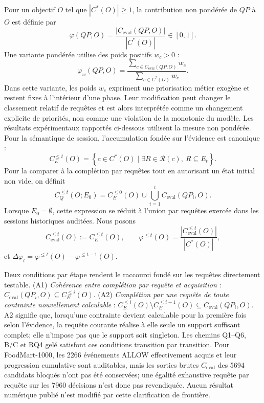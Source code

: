 \documentclass[journal]{IEEEtran}
\begin{document}
Pour un objectif $O$ tel que $|C^*(O)|\ge 1$, la contribution non pondérée de $QP$ à $O$ est définie par
\[
\varphi(QP,O)=\frac{|C_{\mathrm{eval}}(QP,O)|}{|C^*(O)|}\in[0,1].
\]
Une variante pondérée utilise des poids positifs $w_c>0$ :
\[
\varphi_w(QP,O)=\frac{\sum_{c\in C_{\mathrm{eval}}(QP,O)} w_c}{\sum_{c\in C^*(O)} w_c}.
\]
Dans cette variante, les poids $w_c$ expriment une priorisation métier exogène et restent fixes à l'intérieur d'une phase. Leur modification peut changer le classement relatif de requêtes et est alors interprétée comme un changement explicite de priorités, non comme une violation de la monotonie du modèle. Les résultats expérimentaux rapportés ci-dessous utilisent la mesure non pondérée.
Pour la sémantique de session, l'accumulation fondée sur l'évidence est canonique :
\[
C_E^{\le t}(O)=\left\{c\in C^*(O)\mid \exists R\in\mathcal R(c),\ R\subseteq E_t\right\}.
\]
Pour la comparer à la complétion par requêtes tout en autorisant un état initial non vide, on définit
\[
C_Q^{\le t}(O;E_0)=C_E^{\le0}(O)\cup\bigcup_{i=1}^{t} C_{\mathrm{eval}}(QP_i,O).
\]
Lorsque $E_0=\emptyset$, cette expression se réduit à l'union par requêtes exercée dans les sessions historiques auditées. Nous posons
\[
C_{\mathrm{eval}}^{\le t}(O):=C_E^{\le t}(O),\qquad
\varphi^{\le t}(O)=\frac{|C_{\mathrm{eval}}^{\le t}(O)|}{|C^*(O)|},
\]
et $\Delta\varphi_t=\varphi^{\le t}(O)-\varphi^{\le t-1}(O)$.

Deux conditions par étape rendent le raccourci fondé sur les requêtes directement testable. (A1) \emph{Cohérence entre complétion par requête et acquisition} : $C_{\mathrm{eval}}(QP_i,O)\subseteq C_E^{\le i}(O)$. (A2) \emph{Complétion par une requête de toute contrainte nouvellement calculable} : $C_E^{\le i}(O)\setminus C_E^{\le i-1}(O)\subseteq C_{\mathrm{eval}}(QP_i,O)$. A2 signifie que, lorsqu'une contrainte devient calculable pour la première fois selon l'évidence, la requête courante réalise à elle seule un support suffisant complet; elle n'impose pas que le support soit singleton. Les chemins Q1--Q6, B/C et RQ4 gelé satisfont ces conditions transition par transition. Pour FoodMart-1000, les 2266 événements ALLOW effectivement acquis et leur progression cumulative sont auditables, mais les sorties brutes $C_{\mathrm{eval}}$ des 5694 candidats bloqués n'ont pas été conservées; une égalité exhaustive requête par requête sur les 7960 décisions n'est donc pas revendiquée. Aucun résultat numérique publié n'est modifié par cette clarification de frontière.
\end{document}
